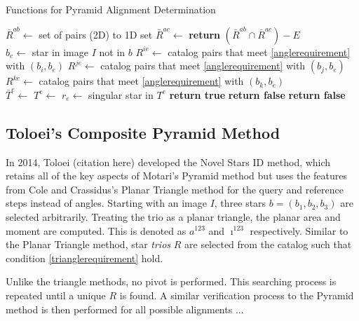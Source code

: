 \begin{algorithm}
\caption{Functions for Pyramid Alignment Determination} \label{Pyramid Helpers}
\begin{algorithmic}[1]
\State $\bar{R}^{ab} \gets $  \Comment set of pairs (2D) to 1D set
\State $\bar{R}^{ac} \gets $ 
\State \textbf{return} $(\bar{R}^{ab} \cap \bar{R}^{ac}) - E$
\EndFunction
\\
\State $b_e \gets $ star in image $I$ not in $b$
\State $R^{ie} \gets$ catalog pairs that meet \eqref{anglerequirement} with $(b_i, b_e)$
\State $R^{je} \gets$ catalog pairs that meet \eqref{anglerequirement} with $(b_j, b_e)$
\State $R^{ke} \gets$ catalog pairs that meet \eqref{anglerequirement} with $(b_k, b_e)$
\\
\State $\bar{T}^e \gets $ 
\State $T^e \gets $ 
\State $r_e \gets $ singular star in $T^e$
\State \textbf{return true}
\Else
\State \textbf{return false}
\EndIf
\Else
\State \textbf{return false}
\EndIf
\EndFunction
\end{algorithmic}
\end{algorithm}

\subsection{Toloei's Composite Pyramid Method}
In 2014, Toloei (citation here) developed the Novel Stars ID method, which retains all of the key aspects of Motari's Pyramid method but uses the features from Cole and Crassidus's Planar Triangle method for the query and reference steps instead of angles. Starting with an image $I$, three stars $b = (b_1, b_2, b_3)$ are selected arbitrarily. Treating the trio as a planar triangle, the planar area and moment are computed. This is denoted as $a^{123}$ and $\imath^{123}$ respectively. Similar to the Planar Triangle method, star \textit{trios} $R$ are selected from the catalog such that condition \eqref{trianglerequirement} hold.

Unlike the triangle methods, no pivot is performed. This searching process is repeated until a unique $R$ is found. A similar verification process to the Pyramid method is then performed for all possible alignments ...

